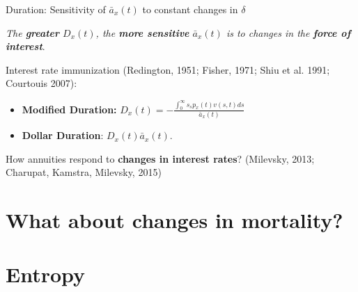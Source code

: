 \documentclass[10pt]{beamer}
\begin{document}
\begin{frame}{Duration: Sensitivity of $\bar{a}_x(t)$ to constant changes in $\delta$}


\begin{center}\nonumber
{}
\end{center} \pause





\begin{center}
\textit{The \textbf{greater} ${D}_{x}(t)$, the \textbf{more sensitive} $\bar{a}_x(t)$ is to changes in the \textbf{force of interest}}.\pause
\end{center}




Interest rate immunization {\scriptsize (Redington, 1951; Fisher, 1971; Shiu et al. 1991; Courtouis 2007)}: \pause

\begin{itemize}
	\item \textbf{Modified Duration:} ${D}_{x}(t) = -\frac{\int_0^\infty s {}_sp_x(t) {v}(s,t)ds}{\bar{a}_x(t)}$\pause
	

	\item \textbf{Dollar Duration}: ${D}_{x}(t)\bar{a}_x(t)$.\pause
\end{itemize}


How annuities respond to\textbf{ changes in interest rates}? {\scriptsize(Milevsky, 2013; Charupat, Kamstra, Milevsky, 2015)}


\end{frame}

\section{What about changes in mortality?}


\section{Entropy}
\end{document}
